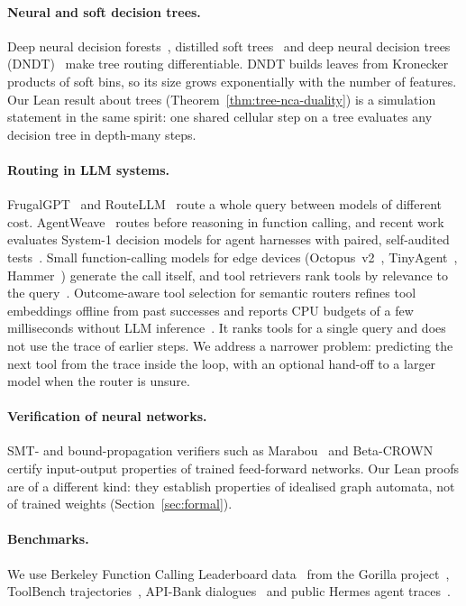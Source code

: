 \documentclass[10pt,twocolumn,letterpaper]{article}
\begin{document}
\paragraph{Neural and soft decision trees.} Deep neural decision forests~\cite{kontschieder2015deep}, distilled soft trees~\cite{frosst2017distilling} and deep neural decision trees (DNDT)~\cite{yang2018deep} make tree routing differentiable. DNDT builds leaves from Kronecker products of soft bins, so its size grows exponentially with the number of features. Our Lean result about trees (Theorem~\ref{thm:tree-nca-duality}) is a simulation statement in the same spirit: one shared cellular step on a tree evaluates any decision tree in depth-many steps.
\paragraph{Routing in LLM systems.} FrugalGPT~\cite{chen2023frugalgpt} and RouteLLM~\cite{ong2024routellm} route a whole query between models of different cost. AgentWeave~\cite{singla2026agentweave} routes before reasoning in function calling, and recent work evaluates System-1 decision models for agent harnesses with paired, self-audited tests~\cite{li2026fastmodels}. Small function-calling models for edge devices (Octopus~v2~\cite{chen2024octopus}, TinyAgent~\cite{erdogan2024tinyagent}, Hammer~\cite{lin2024hammer}) generate the call itself, and tool retrievers rank tools by relevance to the query~\cite{qu2024colt}. Outcome-aware tool selection for semantic routers refines tool embeddings offline from past successes and reports CPU budgets of a few milliseconds without LLM inference~\cite{chen2026oats}. It ranks tools for a single query and does not use the trace of earlier steps. We address a narrower problem: predicting the next tool from the trace inside the loop, with an optional hand-off to a larger model when the router is unsure.
\paragraph{Verification of neural networks.} SMT- and bound-propagation verifiers such as Marabou~\cite{katz2019marabou} and Beta-CROWN~\cite{wang2021beta} certify input-output properties of trained feed-forward networks. Our Lean proofs are of a different kind: they establish properties of idealised graph automata, not of trained weights (Section~\ref{sec:formal}).
\paragraph{Benchmarks.} We use Berkeley Function Calling Leaderboard data~\cite{gorilla-bfcl} from the Gorilla project~\cite{patil2023gorilla}, ToolBench trajectories~\cite{qin2023toolllm}, API-Bank dialogues~\cite{li2023apibank} and public Hermes agent traces~\cite{hermestraces}.
\end{document}
